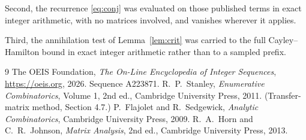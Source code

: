 \documentclass[11pt,a4paper]{article}
\theoremstyle{plain}
\theoremstyle{definition}
\begin{document}
Second, the recurrence \eqref{eq:conj} was evaluated on those published terms in exact
integer arithmetic, with no matrices involved, and vanishes wherever it applies.

Third, the annihilation test of Lemma~\ref{lem:crit} was carried to the full
Cayley--Hamilton bound in exact integer arithmetic rather than to a sampled prefix.

\begin{thebibliography}{9}
 The OEIS Foundation, \emph{The On-Line Encyclopedia of Integer
Sequences}, \url{https://oeis.org}, 2026. Sequence A223871.
 R.~P.~Stanley, \emph{Enumerative Combinatorics}, Volume 1, 2nd ed.,
Cambridge University Press, 2011. (Transfer-matrix method, Section 4.7.)
 P.~Flajolet and R.~Sedgewick, \emph{Analytic Combinatorics}, Cambridge
University Press, 2009.
 R.~A.~Horn and C.~R.~Johnson, \emph{Matrix Analysis}, 2nd ed., Cambridge
University Press, 2013.
\end{thebibliography}
\end{document}
